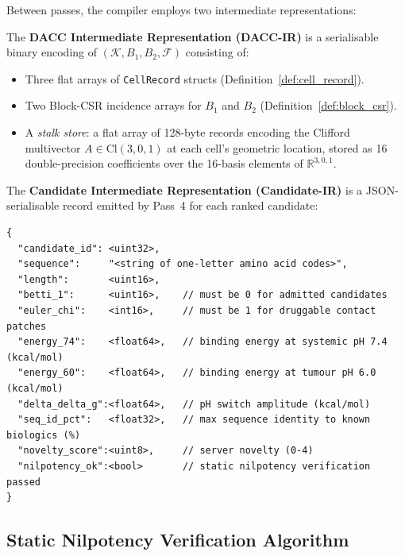 Between passes, the compiler employs two intermediate representations:

\begin{definition}[DACC-IR]
\label{def:dacc_ir}
The \textbf{DACC Intermediate Representation (DACC-IR)} is a serialisable
binary encoding of $(\mathcal{K}, B_1, B_2, \mathcal{F})$ consisting of:
\begin{itemize}[noitemsep]
    \item Three flat arrays of \texttt{CellRecord} structs (Definition~\ref{def:cell_record}).
    \item Two Block-CSR incidence arrays for $B_1$ and $B_2$ (Definition~\ref{def:block_csr}).
    \item A \emph{stalk store}: a flat array of 128-byte records encoding
          the Clifford multivector
          $A \in \mathrm{Cl}(3,0,1)$ at each cell's geometric location,
          stored as 16 double-precision coefficients over the 16-basis
          elements of $\mathbb{R}^{3,0,1}$.
\end{itemize}
\end{definition}

\begin{definition}[Candidate-IR]
\label{def:candidate_ir}
The \textbf{Candidate Intermediate Representation (Candidate-IR)} is a
JSON-serialisable record emitted by Pass~4 for each ranked candidate:
\begin{lstlisting}[language={}]
{
  "candidate_id": <uint32>,
  "sequence":     "<string of one-letter amino acid codes>",
  "length":       <uint16>,
  "betti_1":      <uint16>,    // must be 0 for admitted candidates
  "euler_chi":    <int16>,     // must be 1 for druggable contact patches
  "energy_74":    <float64>,   // binding energy at systemic pH 7.4 (kcal/mol)
  "energy_60":    <float64>,   // binding energy at tumour pH 6.0 (kcal/mol)
  "delta_delta_g":<float64>,   // pH switch amplitude (kcal/mol)
  "seq_id_pct":   <float32>,   // max sequence identity to known biologics (%)
  "novelty_score":<uint8>,     // server novelty (0-4)
  "nilpotency_ok":<bool>       // static nilpotency verification passed
}
\end{lstlisting}
\end{definition}

\subsection{Static Nilpotency Verification Algorithm}
\label{subsec:nilpotency_verifier}

